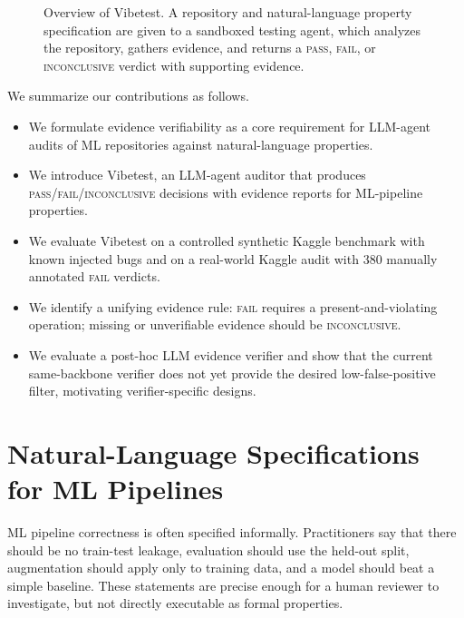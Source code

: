 \documentclass[11pt]{article}
\begin{document}
\begin{figure}[t]
{}
  \caption{Overview of Vibetest. A repository and natural-language property specification are given to a sandboxed testing agent, which analyzes the repository, gathers evidence, and returns a \textsc{pass}, \textsc{fail}, or \textsc{inconclusive} verdict with supporting evidence.}
  \label{fig:overview}
\end{figure}

We summarize our contributions as follows.
\begin{itemize}
  \item We formulate evidence verifiability as a core requirement for LLM-agent audits of ML repositories against natural-language properties.
  \item We introduce Vibetest, an LLM-agent auditor that produces \textsc{pass}/\textsc{fail}/\textsc{inconclusive} decisions with evidence reports for ML-pipeline properties.
  \item We evaluate Vibetest on a controlled synthetic Kaggle benchmark with known injected bugs and on a real-world Kaggle audit with 380 manually annotated \textsc{fail} verdicts.
  \item We identify a unifying evidence rule: \textsc{fail} requires a present-and-violating operation; missing or unverifiable evidence should be \textsc{inconclusive}.
  \item We evaluate a post-hoc LLM evidence verifier and show that the current same-backbone verifier does not yet provide the desired low-false-positive filter, motivating verifier-specific designs.
\end{itemize}

\section{Natural-Language Specifications for ML Pipelines}
\label{sec:specs}

ML pipeline correctness is often specified informally.
Practitioners say that there should be no train-test leakage, evaluation should use the held-out split, augmentation should apply only to training data, and a model should beat a simple baseline.
These statements are precise enough for a human reviewer to investigate, but not directly executable as formal properties.
\end{document}
